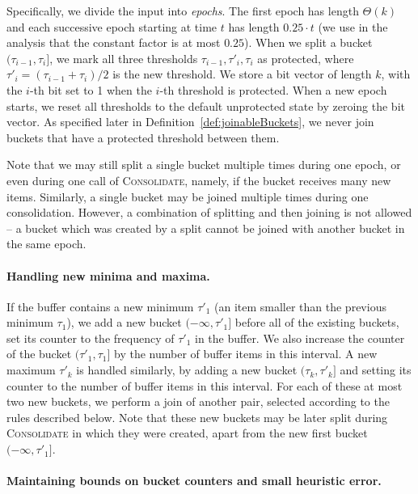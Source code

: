 \documentclass[acmsmall]{acmart}
\newcommand{\consolidate}{\textsc{Consolidate}\xspace}
\theoremstyle{remark}
\begin{document}
Specifically, we divide the input into \emph{epochs}. The first epoch has length $\Theta(k)$ and each successive epoch starting at time $t$ has length $0.25 \cdot t$ (we use in the analysis that the constant factor is at most $0.25$). When we split a bucket $(\tau_{i-1}, \tau_i]$, we mark all three thresholds $\tau_{i-1}, \tau'_i, \tau_i$ as protected, where $\tau'_i = (\tau_{i-1} + \tau_i)/2$ is the new threshold.
We store a bit vector of length $k$, with the $i$-th bit set to 1 when the $i$-th threshold is protected.
When a new epoch starts, we reset all thresholds to the default unprotected state
by zeroing the bit vector.
As specified later in Definition~\ref{def:joinableBuckets}, we never join buckets that have a protected threshold between them.

Note that we may still split a single bucket multiple times during one epoch,
or even during one call of \consolidate, namely, if the bucket receives many new items. Similarly, a single bucket may be joined multiple times during one consolidation.
However, a combination of splitting and then joining is not allowed -- a bucket which was created by a split cannot be joined with another bucket in the same epoch.

\paragraph{Handling new minima and maxima.}

If the buffer contains a new minimum $\tau'_1$ (an item smaller than the previous minimum $\tau_1$), we add a new bucket $(-\infty, \tau'_1]$ before all of the existing
buckets, set its counter to the frequency of $\tau'_1$ in the buffer. We also increase the counter
of the bucket $(\tau'_1, \tau_1]$ by the number of buffer items in this interval.
A new maximum $\tau'_{k}$ is handled similarly, by adding a new bucket $(\tau_{k}, \tau'_{k}]$ and setting
its counter to the number of buffer items in this interval.
For each of these at most two new buckets, we perform a join of another pair, selected according to the rules described below.
Note that these new buckets may be later split during \consolidate in which they were created, apart from the new first bucket $(-\infty, \tau'_1]$.


\paragraph{Maintaining bounds on bucket counters and small heuristic error.}
\end{document}
